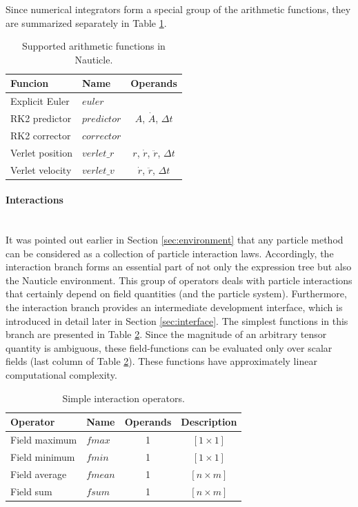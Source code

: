 \documentclass[a4paper,12pt,openany]{book}
\newcommand{\myparagraph}[1]{\paragraph{#1}\mbox{}\\\noindent}
\theoremstyle{break}
\begin{document}
Since numerical integrators form a special group of the arithmetic functions, they are summarized separately in Table \ref{tbl:arfc_int}. 
\begin{table} [H]
\begin{center}
\caption{Supported arithmetic functions in Nauticle.}\label{tbl:arfc_int}
\begin{tabular}{ l l c }
\toprule[1.5pt]
\bf Funcion & \bf Name & \bf Operands \\ 
\midrule
Explicit Euler & $euler$ & \multirow{3}{*}{$A$, $\dot A$, $\Delta t$}   \\
RK2 predictor & $predictor$ & \\
RK2 corrector & $corrector$ &  \\
Verlet position & $verlet\_r$ & $r$, $\dot r$, $\ddot r$, $\Delta t$ \\
Verlet velocity & $verlet\_v$ & $\dot r$, $\ddot r$, $\Delta t$ \\
\bottomrule[1.25pt]
\end{tabular}
\end{center}
\end{table}

\myparagraph{Interactions} \label{sec:interactions}
It was pointed out earlier in Section \ref{sec:environment} that any particle method can be considered as a collection of particle interaction laws. Accordingly, the interaction branch forms an essential part of not only the expression tree but also the Nauticle environment. This group of operators deals with particle interactions that certainly depend on field quantities (and the particle system). Furthermore, the interaction branch provides an intermediate development interface, which is introduced in detail later in Section \ref{sec:interface}.
The simplest functions in this branch are presented in Table \ref{tbl:fsearch}. Since the magnitude of an arbitrary tensor quantity is ambiguous, these field-functions can be evaluated only over scalar fields (last column of Table \ref{tbl:fsearch}). These functions have approximately linear computational complexity.
\begin{table}[H]
\begin{center}
\caption{Simple interaction operators.}\label{tbl:fsearch}
\begin{tabular}{ l l c c }
\toprule[1.5pt]
\bf Operator & \bf Name & \bf Operands & \bf Description\\
\midrule
Field maximum & $fmax$ & 1 & $[1 \times 1]$\\ 
Field minimum & $fmin$ & 1 & $[1 \times 1]$\\ 
Field average & $fmean$ & 1 & $[n \times m]$\\
Field sum & $fsum$ & 1 & $[n \times m]$\\
\bottomrule[1.25pt]
\end{tabular}
\end{center}
\end{table}
\end{document}

